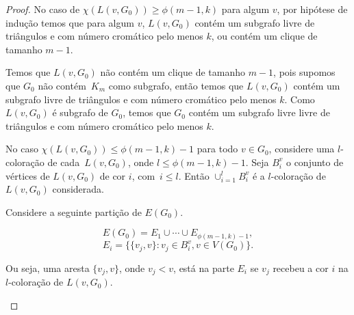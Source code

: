 \begin{proof}
No caso de $\chi(L(v,G_0)) \geq \phi(m-1,k)$ para algum $v$, por hipótese de indução temos que para algum $v$, $L(v, G_0)$ contém um subgrafo livre de triângulos e com número cromático pelo menos $k$, ou contém um clique de tamanho $m-1$.

Temos que $L(v, G_0)$ não contém um clique de tamanho $m-1$, pois supomos que $G_0$ não contém~$K_m$ como subgrafo, então temos que $L(v, G_0)$ contém um subgrafo livre de triângulos e com número cromático pelo menos $k$. Como $L(v,G_0)$ é subgrafo de $G_0$, temos que $G_0$ contém um subgrafo livre livre de triângulos e com número cromático pelo menos $k$.


No caso $\chi(L(v,G_0)) \leq \phi(m-1,k)-1$ para todo $v\in G_0$, considere uma $l$-coloração de cada~$L(v, G_0)$, onde $l \leq \phi(m-1, k)-1$. Seja $B_i^v$ o conjunto de vértices de $L(v, G_0)$ de cor $i$, com~$i \leq l$. Então $\cup_{i=1}^l B_i^v$ é a $l$-coloração de $L(v,G_0)$ considerada.

Considere a seguinte partição de $E(G_0)$.

\[E(G_0) = E_1 \cup \cdots \cup E_{\phi(m-1,k)-1},\]
\[E_i = \{\{v_j,v\} : v_j \in B_i^v, v\in V(G_0)\}.\]

Ou seja, uma aresta $\{v_j, v\}$, onde $v_j < v$, está na parte $E_i$ se $v_j$ recebeu a cor $i$ na $l$-coloração de $L(v, G_0)$.

\begin{figure}[H]
\centering
{}
\end{figure}
\end{proof}
